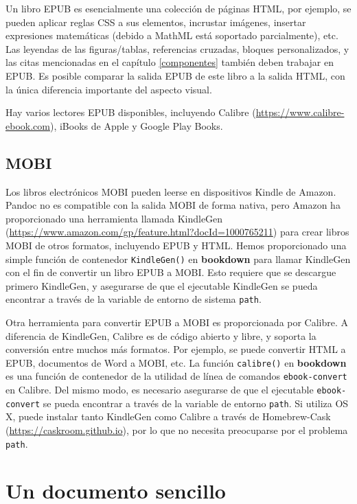 \documentclass[12pt,]{krantz}
\theoremstyle{definition}
\theoremstyle{definition}
\theoremstyle{remark}
\begin{document}
Un libro EPUB es esencialmente una colección de páginas HTML, por
ejemplo, se pueden aplicar reglas CSS a sus elementos, incrustar
imágenes, insertar expresiones matemáticas (debido a MathML está
soportado parcialmente), etc. Las leyendas de las figuras/tablas,
referencias cruzadas, bloques personalizados, y las citas mencionadas en
el capítulo \ref{componentes} también deben trabajar en EPUB. Es posible
comparar la salida EPUB de este libro a la salida HTML, con la única
diferencia importante del aspecto visual.

Hay varios lectores EPUB disponibles, incluyendo Calibre
(\url{https://www.calibre-ebook.com}), iBooks de Apple y Google Play
Books.

\subsection{MOBI}\label{mobi}

Los libros electrónicos MOBI pueden leerse en dispositivos Kindle de
Amazon. Pandoc no es compatible con la salida MOBI de forma nativa, pero
Amazon ha proporcionado una herramienta llamada KindleGen
(\url{https://www.amazon.com/gp/feature.html?docId=1000765211}) para
crear libros MOBI de otros formatos, incluyendo EPUB y HTML. Hemos
proporcionado una simple función de contenedor \texttt{KindleGen()} en
\textbf{bookdown} para llamar KindleGen con el fin de convertir un libro
EPUB a MOBI. Esto requiere que se descargue primero KindleGen, y
asegurarse de que el ejecutable KindleGen se pueda encontrar a través de
la variable de entorno de sistema \texttt{path}.

Otra herramienta para convertir EPUB a MOBI es proporcionada por
Calibre. A diferencia de KindleGen, Calibre es de código abierto y
libre, y soporta la conversión entre muchos más formatos. Por ejemplo,
se puede convertir HTML a EPUB, documentos de Word a MOBI, etc. La
función \texttt{calibre()} en \textbf{bookdown} es una función de
contenedor de la utilidad de línea de comandos \texttt{ebook-convert} en
Calibre. Del mismo modo, es necesario asegurarse de que el ejecutable
\texttt{ebook-convert} se pueda encontrar a través de la variable de
entorno \texttt{path}. Si utiliza OS X, puede instalar tanto KindleGen
como Calibre a través de Homebrew-Cask
(\url{https://caskroom.github.io}), por lo que no necesita preocuparse
por el problema \texttt{path}.

\hypertarget{un-documento-sencillo}{\section{Un documento
sencillo}\label{un-documento-sencillo}}
\end{document}
